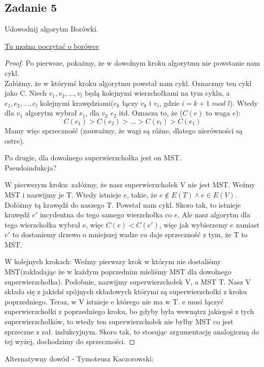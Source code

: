 \documentclass[a4paper]{article}
\begin{document}
\subsection*{Zadanie 5}
Udowodnij algorytm Borówki.

\href{https://pl.wikipedia.org/wiki/Algorytm_Bor%C5%AFvki}{Tu można poczytać o borówce}

\begin{proof}

Po pierwsze, pokażmy, że w dowolnym kroku algorytmu nie powstanie nam cykl.\\
Załóżmy, że w którymś kroku algorytmu powstał nam cykl. Oznaczmy ten cykl jako C. Niech $v_1,v_2,\dots,v_l$ będą kolejnymi wierzchołkami na tym cyklu, a $e_1,e_2,\dots,e_l$ kolejnymi krawędziami($e_k$ łączy $v_k$ i $v_{i}$, gdzie $i=k+1$ $mod$ $l$). Wtedy dla $v_1$ algorytm wybrał $e_1$, dla $v_2$ $e_2$ itd. Oznacza to, że ($C(e)$ to waga $e$):
$$C(e_1)>C(e_2)>\dots>C(e_l)>C(e_1)$$
Mamy więc sprzeczność (zauważmy, że wagi są różne, dlatego nierówności są ostre).

Po drugie, dla dowolnego superwierzchołka jest on MST.\\
Pseudoindukcja?

W pierwszym kroku: załóżmy, że nasz superwierzchołek V nie jest MST. Weźmy MST i nazwijmy je T. Wtedy istnieje $e$, takie, że $e\not\in E(T) \wedge e\in E(V)$. Dołóżmy tą krawędź do naszego T. Powstał nam cykl. Skoro tak, to istnieje krawędź $e'$ incydentna do tego samego wierzchołka co $e$. Ale nasz algorytm dla tego wierzchołka wybrał e, więc $C(e)<C(e')$, więc jak wybierzemy $e$ zamiast $e'$ to dostaniemy drzewo o mniejszej wadze co daje sprzeczność z tym, że T to MST.

W kolejnych krokach: Weźmy pierwszy krok w którym nie dostaliśmy MST(zakładając że w każdym poprzednim mieliśmy MST dla dowolnego superwierzchołka). Podobnie, nazwijmy superwierzchołek V, a MST T. Nasz V składa się z jakichś spójnych składowych którymi są superwierzchołki z kroku poprzedniego. Teraz, w V istnieje e którego nie ma w T. e musi łączyć superwierzchołki z poprzedniego kroku, bo gdyby była wewnątrz jakiegoś z tych superwierzchołków, to wtedy ten superwierzchołek nie byłby MST co jest sprzeczne z zał. indukcyjnym. Skoro tak, to stosując argumentację analogiczną do tej wyżej, dochodzimy do sprzeczności.

\end{proof}
\iffalse
Alternatywny dowód - Tymoteusz Kaczorowski:\\
\end{document}
